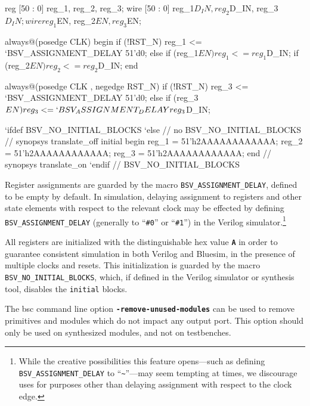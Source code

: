 \documentclass{article}
\newenvironment{centerboxverbatim}
  {\center
   \boxedverbatim}
  {\endboxedverbatim
  {\endcenter }}
\begin{document}
\begin{centerboxverbatim}
reg [50 : 0] reg_1, reg_2, reg_3;
wire [50 : 0] reg_1$D_IN, reg_2$D_IN, reg_3$D_IN;
wire reg_1$EN, reg_2$EN, reg_3$EN;

always@(posedge CLK)
begin
  if (!RST_N)
    reg_1 <= `BSV_ASSIGNMENT_DELAY 51'd0;
  else
    if (reg_1$EN) reg_1 <= reg_1$D_IN;
  if (reg_2$EN) reg_2 <= reg_2$D_IN;
end

always@(posedge CLK , negedge RST_N)
if (!RST_N)
  reg_3 <= `BSV_ASSIGNMENT_DELAY 51'd0;
else
  if (reg_3$EN) reg_3 <= `BSV_ASSIGNMENT_DELAY reg_3$D_IN;

`ifdef BSV_NO_INITIAL_BLOCKS
`else // no BSV_NO_INITIAL_BLOCKS
// synopsys translate_off
initial
begin
  reg_1 = 51'h2AAAAAAAAAAAA;
  reg_2 = 51'h2AAAAAAAAAAAA;
  reg_3 = 51'h2AAAAAAAAAAAA;
end
// synopsys translate_on
`endif // BSV_NO_INITIAL_BLOCKS
\end{centerboxverbatim}

Register assignments are guarded by the macro \texttt{BSV\_ASSIGNMENT\_DELAY},
defined to be empty by default.  In simulation, delaying assignment to
registers and other state elements with respect to the relevant clock may be
effected by defining \texttt{BSV\_ASSIGNMENT\_DELAY} (generally to
``\texttt{\#0}'' or ``\texttt{\#1}'') in the Verilog simulator.\footnote{While
the creative possibilities this feature opens---such as defining
\texttt{BSV\_ASSIGNMENT\_DELAY} to ``\texttt{\~}''---may seem tempting at
times, we discourage uses for purposes other than delaying assignment with
respect to the clock edge.}

All registers are initialized with the distinguishable hex value {\bf\tt A} in
order to guarantee consistent simulation in both Verilog and Bluesim, in the
presence of multiple clocks and resets.  This initialization is guarded by the
macro \texttt{BSV\_NO\_INITIAL\_BLOCKS}, which, if defined in the Verilog
simulator or synthesis tool, disables the \texttt{initial} blocks.


The bsc command line option {\bf\tt -remove-unused-modules} can be used
to remove primitives and modules which do not impact any output port.
This option should only be used on synthesized modules, and not on
testbenches.
\end{document}
